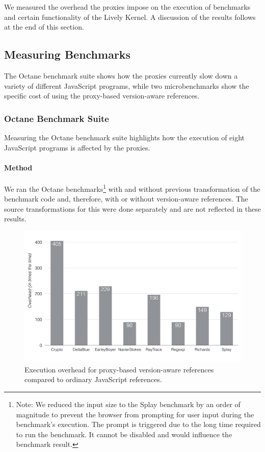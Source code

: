 We measured the overhead the proxies impose on the execution of benchmarks and certain functionality of the Lively Kernel.
A discussion of the results follows at the end of this section.


\subsection{Measuring Benchmarks}

The Octane benchmark suite shows how the proxies currently slow down a variety of different JavaScript programs, while two microbenchmarks show the specific cost of using the proxy-based version-aware references.

\subsubsection{Octane Benchmark Suite}

Measuring the Octane benchmark suite highlights how the execution of eight JavaScript programs is affected by the proxies.

\paragraph{Method}
We ran the Octane benchmarks\footnote{Note: We reduced the input size to the Splay benchmark by an order of magnitude to prevent the browser from prompting for user input during the benchmark's execution. The prompt is triggered due to the long time required to run the benchmark. It cannot be disabled and would influence the benchmark result.} with and without previous transformation of the benchmark code and, therefore, with or without version-aware references.
The source transformations for this were done separately and are not reflected in these results.

\begin{figure}[h]
    \centering
    \includegraphics[width=\textwidth]{figures/6_evaluation/3_executionOverhead.pdf}
    \caption{Execution overhead for proxy-based version-aware references compared to ordinary JavaScript references.}
    \label{fig:ExecutionOverhead}
\end{figure}

